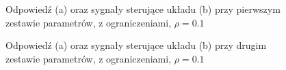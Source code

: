 \documentclass{article}
\begin{document}
\begin{figure}[H]
    \centering
    \caption{Odpowiedź (a) oraz sygnały sterujące układu (b) przy pierwszym zestawie parametrów, z ograniczeniami, $\rho=0.1$}
    \label{fig:1z}
\end{figure}

\begin{figure}[H]
    \centering
    \caption{Odpowiedź (a) oraz sygnały sterujące układu (b) przy drugim zestawie parametrów, z ograniczeniami, $\rho=0.1$}
    \label{fig:2z}
\end{figure}
\end{document}
